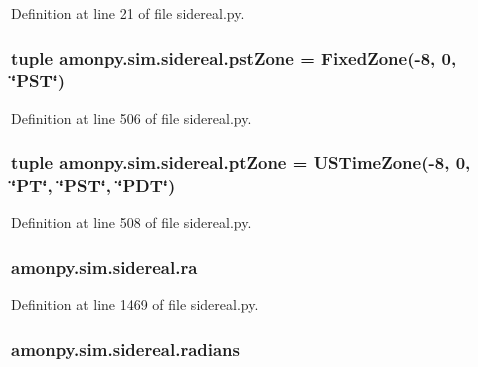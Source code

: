 Definition at line 21 of file sidereal.\-py.

\hypertarget{namespaceamonpy_1_1sim_1_1sidereal_a959f5a3bba85ba90d4efa5c021426171}{
\subsubsection[{pst\-Zone}]{\setlength{\rightskip}{0pt plus 5cm}tuple amonpy.\-sim.\-sidereal.\-pst\-Zone = {\bf Fixed\-Zone}(-\/8, 0, \char`\"{}P\-S\-T\char`\"{})}}\label{namespaceamonpy_1_1sim_1_1sidereal_a959f5a3bba85ba90d4efa5c021426171}


Definition at line 506 of file sidereal.\-py.

\hypertarget{namespaceamonpy_1_1sim_1_1sidereal_a1e8455573c3a0741ed720fd0534453ef}{
\subsubsection[{pt\-Zone}]{\setlength{\rightskip}{0pt plus 5cm}tuple amonpy.\-sim.\-sidereal.\-pt\-Zone = {\bf U\-S\-Time\-Zone}(-\/8, 0, \char`\"{}P\-T\char`\"{}, \char`\"{}P\-S\-T\char`\"{}, \char`\"{}P\-D\-T\char`\"{})}}\label{namespaceamonpy_1_1sim_1_1sidereal_a1e8455573c3a0741ed720fd0534453ef}


Definition at line 508 of file sidereal.\-py.

\hypertarget{namespaceamonpy_1_1sim_1_1sidereal_ab0d219129e8288dbd1df5b48472a7ac7}{
\subsubsection[{ra}]{\setlength{\rightskip}{0pt plus 5cm}amonpy.\-sim.\-sidereal.\-ra}}\label{namespaceamonpy_1_1sim_1_1sidereal_ab0d219129e8288dbd1df5b48472a7ac7}


Definition at line 1469 of file sidereal.\-py.

\hypertarget{namespaceamonpy_1_1sim_1_1sidereal_a821964057b74cb5a406284766eb22f18}{
\subsubsection[{radians}]{\setlength{\rightskip}{0pt plus 5cm}amonpy.\-sim.\-sidereal.\-radians}}\label{namespaceamonpy_1_1sim_1_1sidereal_a821964057b74cb5a406284766eb22f18}


